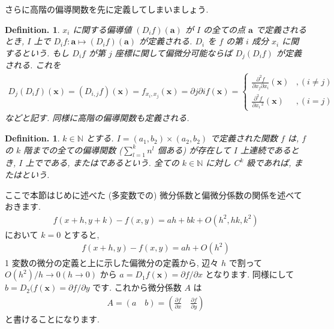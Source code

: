 \documentclass[openany, a4paper, oneside]{jsbook}
\theoremstyle{break}
\theoremstyle{breakdefn}
\newtheorem{defn}[thm]{Definition.}
\newcommand{\bN}{\mathbb{N}}
\begin{document}
さらに高階の偏導関数を先に定義してしまいましょう.
\begin{defn}
 $x_i$ に関する偏導値 $(D_if) (\bm{a})$ が $I$ の全ての点 $\bm{a}$ で定義されるとき,
 $I$ 上で $D_if:\bm{a}\mapsto (D_if) (\bm{a})$ が定義される.
 $D_i$ を $f$ の第 $i$ 成分 $x_i$ に関するという.
もし $D_if$ が第 $j$ 座標に関して偏微分可能ならば $D_j (D_if)$ が定義される. これを
    \begin{align}
        D_j (D_if) (\bm{x})
        =
        (D_{i,j}f) (\bm{x})
        =
        f_{x_i,x_j}(\bm{x})
        =
        \partial j \partial i f (\bm{x})
        =
        \begin{cases}
            \frac{\partial ^2 f}{\partial x_j \partial x_i}(\bm{x})&,(i\not= j)\\
            \frac{\partial ^2 f} {\partial x_i\,^2}(\bm{x})&,(i=j)
        \end{cases}
    \end{align}
などと記す. 同様に高階の偏導関数も定義される.
\end{defn}
\begin{defn}
 $k\in\bN$ とする.  $I=(a_1,b_2)\times (a_2,b_2)$ で定義された関数 $f$ は,  $f$ の $k$ 階までの全ての偏導関数
($\sum_{l=1}^k n^l$ 個ある) が存在して $I$ 上連続であるとき,  $I$ 上でである,
またはであるという.
全ての $k\in\bN$ に対し $C^k$ 級であれば, またはという.
\end{defn}

ここで本節はじめに述べた (多変数での) 微分係数と偏微分係数の関係を述べておきます.
    \begin{align}
        f (x+h,y+k)-f (x,y)
        =
        ah + bk + O (h^2,h k,k^2)
    \end{align}
において $k=0$ とすると,
    \begin{align}
        f (x+h,y)-f (x,y)
        =
        ah + O (h^2)
    \end{align}
1 変数の微分の定義と上に示した偏微分の定義から, 辺々 $h$ で割って $O (h^2)/h\to0 (h\to0)$ から
 $a=D_1f (\bm{x})=\partial f/\partial x$ となります.
同様にして $b=D_2 (f (\bm{x})=\partial f/\partial y$ です.
これから微分係数 $A$ は
    \begin{align}
        A
        =
        (a \quad b)
        =
        \left ( \frac{\partial f} {\partial x} \quad \frac{\partial f} {\partial y} \right)
    \end{align}
と書けることになります.
\end{document}
